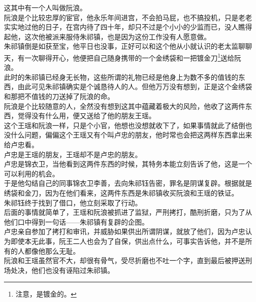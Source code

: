\begin{multicols}{\theparacolNo}
这其中有一个人叫做阮浪。\\

阮浪是个比较忠厚的宦官，他永乐年间进宫，不会拍马屁，也不搞投机，只是老老实实地过他的日子，在宫内待了四十年，却只不过是个小小的少监而已，没人瞧得起他，这次他被派来服侍朱祁镇，也是因为这份工作没有人愿意做。\\

朱祁镇倒是如获至宝，他平日也没事，正好可以和这个他从小就认识的老太监聊聊天，有一次聊得开心，他便把自己随身携带的一个金绣袋和一把镀金刀\footnote{注意，是镀金的。}送给阮浪。\\

此时的朱祁镇已经身无长物，这些所谓的礼物已经是他身上为数不多的值钱的东西，由此可见朱祁镇确实是个诚恳待人的人。但他万万没有想到，正是这个金绣袋和那把不值钱的刀送掉了阮浪的命。\\

阮浪是个比较随意的人，全然没有想到这其中蕴藏着极大的风险，他收了这两件东西，觉得没有什么用，便又送给了他的朋友王瑶。\\

这个王瑶和阮浪一样，只是个小官，他想也没想就收下了，如果事情就此了结倒也没什么问题，偏偏这个王瑶又有个叫卢忠的朋友，他时常也会把这两样东西拿出来给卢忠看。\\

卢忠是王瑶的朋友，王瑶却不是卢忠的朋友。\\

卢忠是锦衣卫，当他看到这两件东西的时候，其特务本能立刻告诉了他，这是一个可以利用的机会。\\

于是他勾结自己的同事锦衣卫李善，去向朱祁钰告密，罪名是阴谋复辟。根据就是绣袋和金刀，因为在他们看来，这两件东西是朱祁镇收买阮浪和王瑶的铁证。\\

朱祁钰终于找到了借口，他立刻采取了行动。\\

后面的事情就简单了，王瑶和阮浪被抓进了监狱，严刑拷打，酷刑折磨，只为了从他们口中得到一句话——朱祁镇有复辟的企图。\\

卢忠亲自参加了拷打和审讯，并威胁如果供出所谓阴谋，就放了他们，因为卢忠认为即使本无此事，阮王二人也会为了自保，供出点什么，可事实告诉他，并不是所有的人都像他那么无耻。\\

阮浪和王瑶虽然官不大，却很有骨气，受尽折磨也不吐一个字，直到最后被押送刑场处决，他们也没有诬陷过朱祁镇。\\


\end{multicols}
